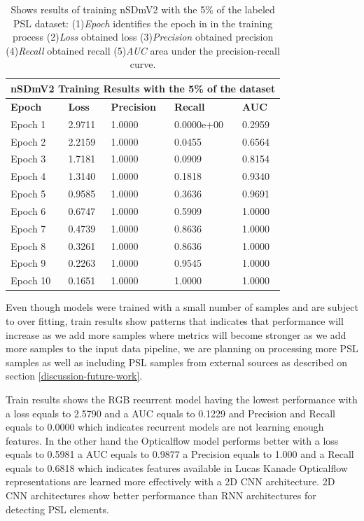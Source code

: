 \documentclass[twocolumn,conference]{article}
\begin{document}
\begin{table}[!htb]
\captionsetup{font=footnotesize}
\centering
\begin{tabular}{ p{2.8cm} p{2.8cm} p{2.8cm} p{2.8cm} p{2.8cm} }
\toprule
\multicolumn{5}{c}{\textbf{nSDmV2 Training Results with the 5\% of the dataset}} \\
\hline
\hline
\textbf{Epoch}&	\textbf{Loss}	&\textbf{Precision}	&\textbf{Recall}	&\textbf{AUC} \\
\hline
\midrule
Epoch 1&	2.9711&	1.0000&	0.0000e+00&	0.2959\\
Epoch 2&	2.2159&	1.0000&	0.0455&	0.6564\\
Epoch 3&	1.7181&	1.0000&	0.0909&	0.8154\\
Epoch 4&	1.3140&	1.0000&	0.1818&	0.9340\\
Epoch 5&	0.9585&	1.0000&	0.3636&	0.9691\\
Epoch 6&	0.6747&	1.0000&	0.5909&	1.0000\\
Epoch 7&	0.4739&	1.0000&	0.8636&	1.0000\\
Epoch 8&	0.3261&	1.0000&	0.8636&	1.0000\\
Epoch 9&	0.2263&	1.0000&	0.9545&	1.0000\\
Epoch 10&	0.1651&	1.0000&	1.0000&	1.0000\\
\bottomrule
\end{tabular}
\caption{Shows results of training nSDmV2 with the 5\% of the labeled PSL dataset: (1)\textit{Epoch} identifies the epoch in in the training process (2)\textit{Loss} obtained loss (3)\textit{Precision} obtained precision (4)\textit{Recall} obtained recall (5)\textit{AUC} area under the precision-recall curve.}
\label{tab:nSDmV2-detection-results-5-percent}
\end{table}

Even though models were trained with a small number of samples and are subject to over fitting, train results show patterns that indicates that performance will increase as we add more samples where metrics will become stronger as we add more samples to the input data pipeline, we are planning on processing more PSL samples as well as including PSL samples from external sources as described on section \ref{discussion-future-work}.

Train results shows the RGB recurrent model having the lowest performance with a loss equals to 2.5790 and a AUC equals to 0.1229 and Precision and Recall equals to 0.0000 which indicates recurrent models are not learning enough features. In the other hand the Opticalflow model performs better with a loss equals to 0.5981 a AUC equals to 0.9877 a Precision equals to 1.000 and a Recall equals to 0.6818 which indicates features available in Lucas Kanade Opticalflow representations are learned more effectively with a 2D CNN architecture. 2D CNN architectures show better performance than RNN architectures for detecting PSL elements.
\end{document}

